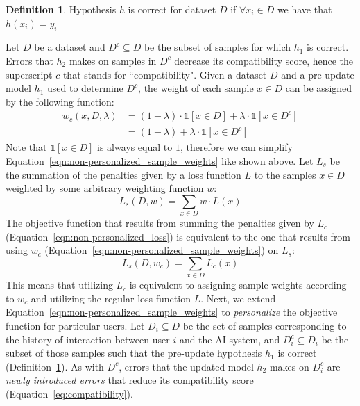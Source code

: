 \documentclass[letterpaper]{article} %
\theoremstyle{definition}
\newtheorem{definition}{Definition}
\begin{document}
\begin{definition}
Hypothesis  $h$  is correct for  dataset $D$ if
$\forall x_i \in D$ we have that $h(x_i)=y_i$
\label{def:hypCorrect}
\end{definition}
Let $D$ be a dataset and $D^c\subseteq D$ be the subset of samples for which $h_1$ is correct. Errors that $h_2$ makes on samples in $D^c$ decrease its compatibility score, hence the superscript $c$ that stands for ``compatibility". Given a dataset $D$ and a pre-update model $h_1$ used to determine $D^c$, the weight of each sample $x\in D$ can be assigned by the following function:
\begin{align}
\label{eqn:non-personalized_sample_weights}
w_c(x,D,\lambda)&=(1-\lambda)\cdot\mathbb{1}[x\in D]+\lambda\cdot\mathbb{1}[x\in D^c] \\  \nonumber
&=(1-\lambda) + \lambda\cdot\mathbb{1}[x\in D^c]
\end{align}
Note that $\mathbb{1}[x\in D]$ is always equal to $1$, therefore we can simplify Equation~\ref{eqn:non-personalized_sample_weights} like shown above. Let $L_s$ be the summation of the penalties given by a loss function $L$ to the samples $x\in D$ weighted by some arbitrary weighting function $w$:
\begin{equation}
\label{eqn:loss_summation}
L_s(D,w) = \sum_{x \in D} w \cdot L(x)
\end{equation}
The objective function that results from summing the penalties given by $L_c$ (Equation~\ref{eqn:non-personalized_loss}) is equivalent to the one that results from using $w_c$ (Equation~\ref{eqn:non-personalized_sample_weights}) on $L_s$:
\begin{equation}
\label{eqn:Ls_equals_Lc}
L_s(D,w_c) = \sum_{x \in D}L_c(x)
\end{equation}
This means that utilizing $L_c$ is equivalent to assigning sample weights according to $w_c$ and utilizing the regular loss function $L$. Next, we extend Equation~\ref{eqn:non-personalized_sample_weights} to  \textit{personalize} the objective function for  particular users.
Let $D_i\subseteq D$ be the set of samples corresponding to the  history of interaction between user $i$ and the AI-system, and $D_i^c \subseteq D_i$ be the subset of those samples such that
the pre-update hypothesis $h_1$ is correct (Definition~\ref{def:hypCorrect}). As with $D^c$, errors that the updated model $h_2$ makes on $D_i^c$ are \textit{newly introduced errors} that reduce its compatibility score (Equation~\ref{eq:compatibility}).
\end{document}
